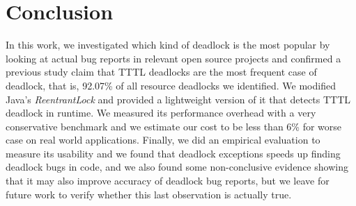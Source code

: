 \section{Conclusion}

In this work, we investigated which kind of deadlock is the most popular by looking at actual bug reports
in relevant open source projects and confirmed a previous study claim that TTTL deadlocks
are the most frequent case of deadlock, that is, 92.07\% of all resource deadlocks we identified.
We modified Java's \emph{ReentrantLock} and provided a lightweight
version of it that detects TTTL deadlock in runtime.
We measured its performance overhead with a very conservative benchmark
and we estimate our cost to be less than 6\% for worse case on real world applications.
Finally, we did an empirical evaluation to measure its usability and we found that
deadlock exceptions speeds up finding deadlock bugs in code, and we also found some
non-conclusive evidence showing that it may also improve accuracy of deadlock bug reports,
but we leave for future work to verify whether this last observation is actually true.